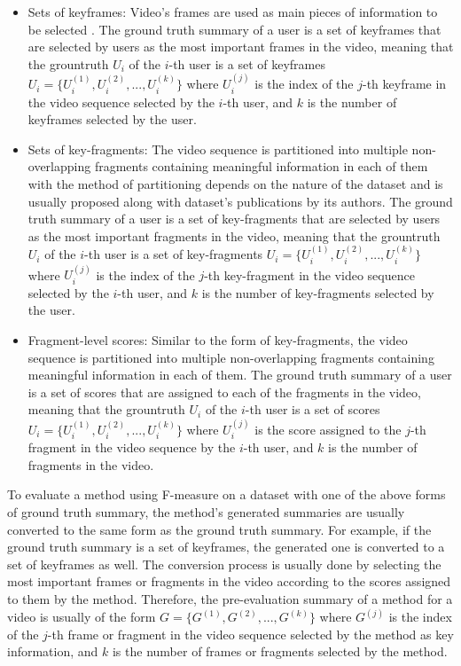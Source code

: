             \begin{itemize}
                \item Sets of keyframes: Video's frames are used as main pieces of information to be selected . The ground truth summary of a user is a set of keyframes that are selected by users as the most important frames in the video, meaning that the grountruth $U_i$ of the $i$-th user is a set of keyframes $U_i = \{U_{i}^{(1)}, U_{i}^{(2)}, ..., U_{i}^{(k)}\}$ where $U_{i}^{(j)}$ is the index of the $j$-th keyframe in the video sequence selected by the $i$-th user, and $k$ is the number of keyframes selected by the user.
                \item Sets of key-fragments: The video sequence is partitioned into multiple non-overlapping fragments containing meaningful information in each of them with the method of partitioning depends on the nature of the dataset and is usually proposed along with dataset's publications by its authors. The ground truth summary of a user is a set of key-fragments that are selected by users as the most important fragments in the video, meaning that the grountruth $U_i$ of the $i$-th user is a set of key-fragments $U_i = \{U_{i}^{(1)}, U_{i}^{(2)}, ..., U_{i}^{(k)}\}$ where $U_{i}^{(j)}$ is the index of the $j$-th key-fragment in the video sequence selected by the $i$-th user, and $k$ is the number of key-fragments selected by the user.
                \item Fragment-level scores: Similar to the form of key-fragments, the video sequence is partitioned into multiple non-overlapping fragments containing meaningful information in each of them. The ground truth summary of a user is a set of scores that are assigned to each of the fragments in the video, meaning that the grountruth $U_i$ of the $i$-th user is a set of scores $U_i = \{U_{i}^{(1)}, U_{i}^{(2)}, ..., U_{i}^{(k)}\}$ where $U_{i}^{(j)}$ is the score assigned to the $j$-th fragment in the video sequence by the $i$-th user, and $k$ is the number of fragments in the video.
            \end{itemize}

            To evaluate a method using F-measure on a dataset with one of the above forms of ground truth summary, the method's generated summaries are usually converted to the same form as the ground truth summary. For example, if the ground truth summary is a set of keyframes, the generated one is converted to a set of keyframes as well. The conversion process is usually done by selecting the most important frames or fragments in the video according to the scores assigned to them by the method. Therefore, the pre-evaluation summary of a method for a video is usually of the form $G = \{G^{(1)}, G^{(2)}, ..., G^{(k)}\}$ where $G^{(j)}$ is the index of the $j$-th frame or fragment in the video sequence selected by the method as key information, and $k$ is the number of frames or fragments selected by the method.

